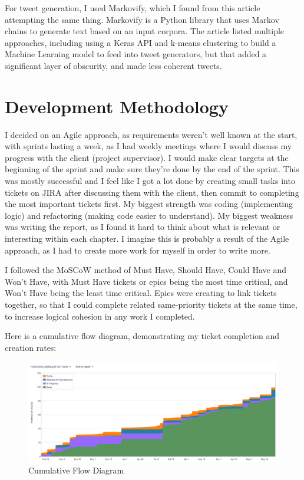 \documentclass{article}
\begin{document}
For tweet generation, I used Markovify, which I found from this article attempting the same thing.
Markovify is a Python library that uses Markov chains to generate text based on an input corpora.
The article listed multiple approaches, including using a Keras API and k-means clustering to build a Machine Learning model to feed into tweet generators, but that added a significant layer of obscurity, and made less coherent tweets.

\newpage
\section{Development Methodology}

I decided on an Agile approach, as requirements weren't well known at the start, with sprints lasting a week, as I had weekly meetings where I would discuss my progress with the client (project supervisor).
I would make clear targets at the beginning of the sprint and make sure they're done by the end of the sprint.
This was mostly successful and I feel like I got a lot done by creating small tasks into tickets on JIRA after discussing them with the client, then commit to completing the most important tickets first.
My biggest strength was coding (implementing logic) and refactoring (making code easier to understand).
My biggest weakness was writing the report, as I found it hard to think about what is relevant or interesting within each chapter.
I imagine this is probably a result of the Agile approach, as I had to create more work for myself in order to write more.

I followed the MoSCoW method of Must Have, Should Have, Could Have and Won't Have, with Must Have tickets or epics being the most time critical, and Won't Have being the least time critical.
Epics were creating to link tickets together, so that I could complete related same-priority tickets at the same time, to increase logical cohesion in any work I completed.

Here is a cumulative flow diagram, demonstrating my ticket completion and creation rates:
\begin{figure}[H]
	\includegraphics[width=\linewidth]{images/cum_flow_diagram.png}
	\caption{Cumulative Flow Diagram}
	\label{fig:cfd}
\end{figure}
\end{document}
